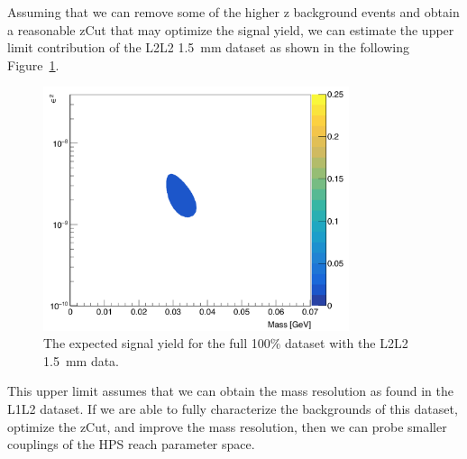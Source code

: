 Assuming that we can remove some of the higher z background events and obtain a reasonable zCut that may optimize the signal yield, we can estimate the upper limit contribution of the L2L2 1.5~mm dataset as shown in the following Figure~\ref{fig:reach1p5_l2l2}.

\begin{figure}[H]
  \centering
     \includegraphics[width=0.8\textwidth]{plots/reachL2L2_1p5.png}
  \caption{The expected signal yield for the full 100$\%$ dataset with the L2L2 1.5~mm data.}
  \label{fig:reach1p5_l2l2}
\end{figure} 

This upper limit assumes that we can obtain the mass resolution as found in the L1L2 dataset. If we are able to fully characterize the backgrounds of this dataset, optimize the zCut, and improve the mass resolution, then we can probe smaller couplings of the HPS reach parameter space. 
